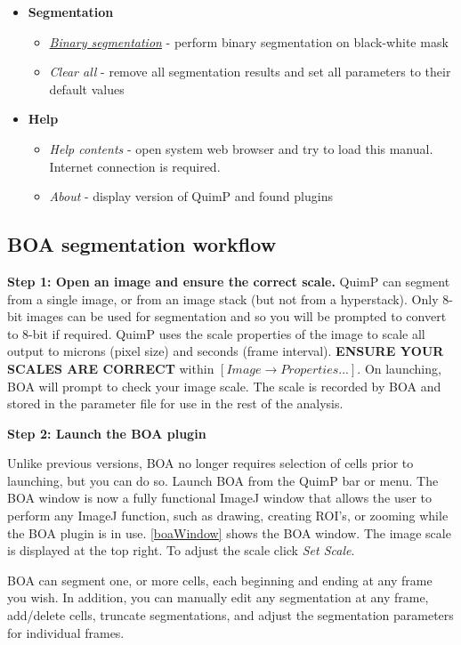 \documentclass[a4paper,12pt]{article}
\begin{document}
\begin{itemize}
\begin{itemize}
	\end{itemize}
	\item \textbf{Segmentation}
	\begin{itemize}
		\item \hyperref[sec:Binary_seg]{\textit{Binary segmentation}} - perform binary segmentation on black-white mask 
		\item \textit{Clear all} - remove all segmentation results and set all parameters to their default values
	\end{itemize}
	\item \textbf{Help}
	\begin{itemize}
		\item \textit{Help contents} - open system web browser and try to load this manual. Internet connection is required. 
		\item \textit{About} - display version of QuimP and found plugins
	\end{itemize}
\end{itemize}

\subsection{BOA segmentation workflow}
\label{sec:boaWorkflow}
\textbf{Step 1: Open an image and ensure the correct scale.}  QuimP can segment from a single image, or from an image stack
(but not from a hyperstack).  Only 8-bit images can be used for segmentation and so you will be prompted to convert to 8-bit 
if required.  QuimP uses the scale properties of the image to scale all output to
 microns (pixel size) and seconds (frame interval).  \textbf{ENSURE YOUR SCALES ARE CORRECT} within $[Image\rightarrow Properties...]$.
 On launching, BOA will prompt to check your image scale. The scale is recorded by BOA and stored in the parameter file for
 use in the rest of the analysis. 


\textbf{Step 2: Launch the BOA plugin} 

Unlike previous versions, BOA no longer requires selection of cells prior to launching, but you can do so.  Launch BOA from the QuimP bar or menu.
The BOA window is now a fully functional ImageJ window that allows the user to perform any ImageJ function, such as drawing,
creating ROI's, or zooming while the BOA plugin is in use.  \autoref{boaWindow} shows the BOA window.
The image scale is displayed at the top right.  To adjust the scale click \textit{Set Scale}.      

BOA can segment one, or more cells, each beginning and ending at any frame you wish.  In addition, you can manually 
edit any segmentation at any frame, add/delete cells, truncate segmentations, and adjust the segmentation
parameters for individual frames.
\end{document}
